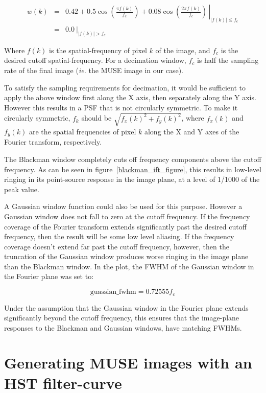 \documentclass[12pt,twoside,a4paper]{article}
\begin{document}
\begin{eqnarray}
w(k) &=& \left.0.42 + 0.5\cos\left(\frac{\pi f(k)}{f_c}\right) +
0.08\cos\left(\frac{2\pi f(k)}{f_c}\right)\,\right\vert_{|f(k)|\le f_c}\\
     &=& 0.0\ \vert_{|f(k)| > f_c}\nonumber
\end{eqnarray}

Where $f(k)$ is the spatial-frequency of pixel $k$ of the image, and
$f_c$ is the desired cutoff spatial-frequency. For a decimation
window, $f_c$ is half the sampling rate of the final image
(\textit{ie.} the MUSE image in our case).

To satisfy the sampling requirements for decimation, it would be
sufficient to apply the above window first along the X axis, then
separately along the Y axis. However this results in a PSF that is not
circularly symmetric. To make it circularly symmetric, $f_k$ should be
$\sqrt{f_x(k)^2 + f_y(k)^2}$, where $f_x(k)$ and $f_y(k)$ are the
spatial frequencies of pixel $k$ along the X and Y axes of the Fourier
transform, respectively.

The Blackman window completely cuts off frequency components above the
cutoff frequency. As can be seen in figure~\ref{blackman_ift_figure},
this results in low-level ringing in its point-source response in the
image plane, at a level of 1/1000 of the peak value.

A Gaussian window function could also be used for this
purpose. However a Gaussian window does not fall to zero at the cutoff
frequency. If the frequency coverage of the Fourier transform extends
significantly past the desired cutoff frequency, then the result will
be some low level aliasing. If the frequency coverage doesn't extend
far past the cutoff frequency, however, then the truncation of the
Gaussian window produces worse ringing in the image plane than the
Blackman window. In the plot, the FWHM of the Gaussian window in the
Fourier plane was set to:

\begin{equation}
  \mbox{guassian\_fwhm} = 0.72555 f_c
\end{equation}

Under the assumption that the Gaussian window in the Fourier plane
extends significantly beyond the cutoff frequency, this ensures that
the image-plane responses to the Blackman and Gaussian windows, have
matching FWHMs.

\section{Generating MUSE images with an HST filter-curve}
\end{document}
